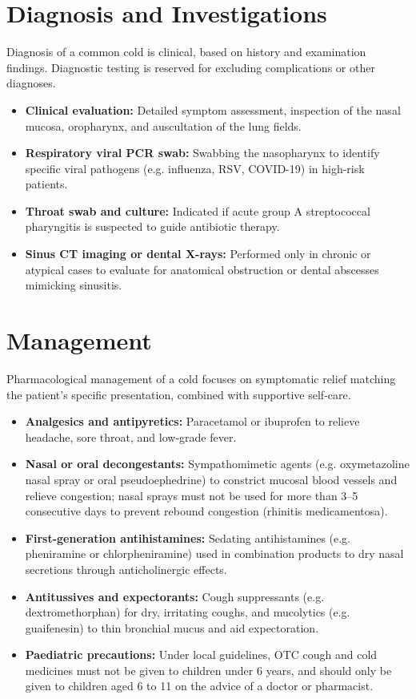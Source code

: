 \section*{Diagnosis and Investigations}
Diagnosis of a common cold is clinical, based on history and examination findings. Diagnostic testing is reserved for excluding complications or other diagnoses.
\begin{itemize}
    \item \textbf{Clinical evaluation:} Detailed symptom assessment, inspection of the nasal mucosa, oropharynx, and auscultation of the lung fields.
    \item \textbf{Respiratory viral PCR swab:} Swabbing the nasopharynx to identify specific viral pathogens (e.g. influenza, RSV, COVID-19) in high-risk patients.
    \item \textbf{Throat swab and culture:} Indicated if acute group A streptococcal pharyngitis is suspected to guide antibiotic therapy.
    \item \textbf{Sinus CT imaging or dental X-rays:} Performed only in chronic or atypical cases to evaluate for anatomical obstruction or dental abscesses mimicking sinusitis.
\end{itemize}

\section*{Management}
Pharmacological management of a cold focuses on symptomatic relief matching the patient's specific presentation, combined with supportive self-care.
\begin{itemize}
    \item \textbf{Analgesics and antipyretics:} Paracetamol or ibuprofen to relieve headache, sore throat, and low-grade fever.
    \item \textbf{Nasal or oral decongestants:} Sympathomimetic agents (e.g. oxymetazoline nasal spray or oral pseudoephedrine) to constrict mucosal blood vessels and relieve congestion; nasal sprays must not be used for more than 3--5 consecutive days to prevent rebound congestion (rhinitis medicamentosa).
    \item \textbf{First-generation antihistamines:} Sedating antihistamines (e.g. pheniramine or chlorpheniramine) used in combination products to dry nasal secretions through anticholinergic effects.
    \item \textbf{Antitussives and expectorants:} Cough suppressants (e.g. dextromethorphan) for dry, irritating coughs, and mucolytics (e.g. guaifenesin) to thin bronchial mucus and aid expectoration.
    \item \textbf{Paediatric precautions:} Under local guidelines, OTC cough and cold medicines must not be given to children under 6 years, and should only be given to children aged 6 to 11 on the advice of a doctor or pharmacist.
\end{itemize}

